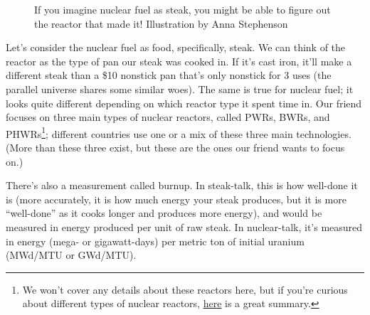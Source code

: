 {\begin{figure}[!htb]
  \centering
  \large If you imagine nuclear fuel as steak, you might be able to figure out 
  the reactor that made it! \small Illustration by Anna Stephenson
\end{figure}

Let's consider the nuclear fuel as food, specifically, steak. We can think of
the reactor as the type of pan our steak was cooked in. If it's cast iron,
it'll make a different steak than a \$10 nonstick pan that's only nonstick for
3 uses (the parallel universe shares some similar woes). The same is true for
nuclear fuel; it looks quite different depending on which reactor type it spent
time in. Our friend focuses on three main types of nuclear reactors, called
\glspl{PWR}, \glspl{BWR}, and \glspl{PHWR}\footnote{We won't cover any details
about these reactors here, but if you're curious about different types of
nuclear reactors,
\href{http://www.world-nuclear.org/uploadedFiles/org/WNA/Publications/Nuclear\_Information/Pocket\%20Guide\%20Reactors.pdf}{\color{violet}here}
is a great summary.}; different countries use one or a mix of these three main
technologies. (More than these three exist, but these are the ones our friend
wants to focus on.) 

There's also a measurement called burnup. In steak-talk, this is how well-done
it is (more accurately, it is how much energy your steak produces, but it is
more ``well-done'' as it cooks longer and produces more energy), and would be
measured in energy produced per unit of raw steak. In nuclear-talk, it's
measured in energy (mega- or gigawatt-days) per metric ton of initial uranium
(MWd/MTU or GWd/MTU). 

}
